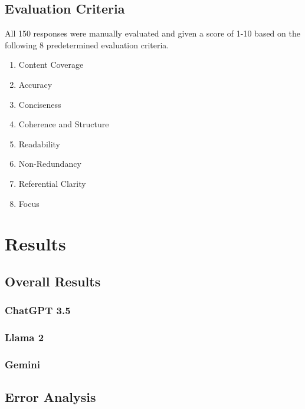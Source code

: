 \documentclass[fleqn,moreauthors,10pt]{ds_report}
\begin{document}
\subsection*{Evaluation Criteria}

All 150 responses were manually evaluated and given a score of 1-10 based on the following 8 predetermined evaluation criteria.

\begin{enumerate}
    \item Content Coverage
    \item Accuracy
    \item Conciseness
    \item Coherence and Structure
    \item Readability
    \item Non-Redundancy
    \item Referential Clarity
    \item Focus
\end{enumerate}


\section*{Results}

\subsection*{Overall Results}

\subsubsection*{ChatGPT 3.5}

\subsubsection*{Llama 2}

\subsubsection*{Gemini}

\subsection*{Error Analysis}

\end{document}
